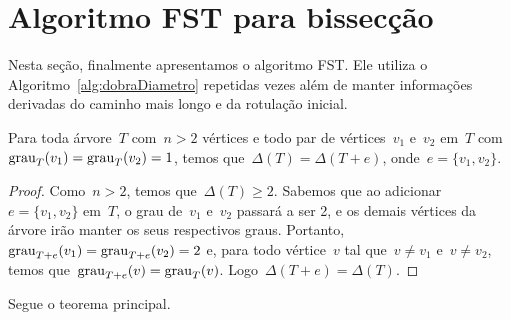 \section {Algoritmo FST para bissecção}

	Nesta seção, finalmente apresentamos o algoritmo FST.
	Ele utiliza o Algoritmo~\ref{alg:dobraDiametro} 
	repetidas vezes além de manter informações derivadas
	do caminho mais longo e da rotulação inicial.

	\begin{lem}
	\label{lem:grauMaximo}
		Para toda árvore~$T$ com~${n>2}$ vértices
		e todo par de vértices~$v_1$ e~$v_2$ em~$T$ 
		com~${\mathrm{grau}_T(v_1)=\mathrm{grau}_T(v_2)=1}$,
		temos que~${\Delta(T) = \Delta(T+ e)}$,
		onde~$e=\{v_1, v_2\}$.
	\end{lem}
	
	
	\begin{proof}
		Como~${n>2}$, temos que~${\Delta(T)\ge 2}$.
		Sabemos que ao adicionar~${e = \{v_1,v_2\}}$ em~$T$, 
		o grau de~$v_1$
		e~$v_2$ passará a ser 2, e os demais vértices da árvore
		irão manter os seus respectivos graus.
		Portanto,~${\mathrm{grau}_{T+e}(v_1)=\mathrm{grau}_{T+ e}(v_2)=2}$
		e, para todo vértice~$v$ tal que~$v\ne v_1$ e~$v\ne v_2$,
		temos que~${\mathrm{grau}_{T+ e}(v)=\mathrm{grau}_T(v)}$.
		Logo~$\Delta(T+e) = \Delta(T)$.
	\end{proof}

	\bigskip

	Segue o teorema principal.

